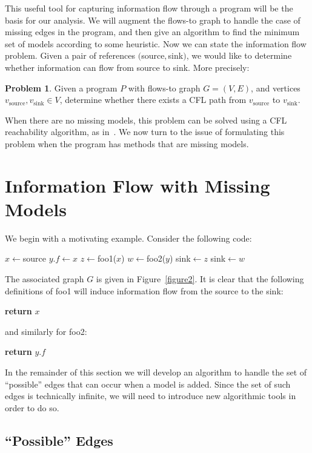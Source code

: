 \documentclass[10pt,twocolumn]{article}
\theoremstyle{definition}
\newtheorem{problem}[theorem]{Problem}
\begin{document}
\noindent This useful tool for capturing information flow through a program will be the basis for our analysis. We will augment the flows-to graph to handle the case of missing edges in the program, and then give an algorithm to find the minimum set of models according to some heuristic. Now we can state the information flow problem. Given a pair of references $($source$,$sink$)$, we would like to determine whether information can flow from source to sink. More precisely:
\begin{problem}
\label{flowproblem}
Given a program $P$ with flows-to graph $G=(V,E)$, and vertices $v_{\text{source}},v_{\text{sink}}\in V$, determine whether there exists a CFL path from $v_{\text{source}}$ to $v_{\text{sink}}$.
\end{problem}
When there are no missing models, this problem can be solved using a CFL reachability algorithm, as in~\cite{reps97}. We now turn to the issue of formulating this problem when the program has methods that are missing models.

\section{Information Flow with Missing Models}

\noindent We begin with a motivating example. Consider the following code:
\begin{algorithmic}
\State $x\gets$source
\State $y.f\gets x$
\State $z\gets$foo1($x$)
\State $w\gets$foo2($y$)
\State sink$\gets z$
\State sink$\gets w$
\end{algorithmic}
\noindent The associated graph $G$ is given in Figure~\ref{figure2}. It is clear that the following definitions of foo1 will induce information flow from the source to the sink:
\begin{algorithmic}
  \State\textbf{return} $x$
\EndProcedure
\end{algorithmic}
and similarly for foo2:
\begin{algorithmic}
	\State\textbf{return} $y.f$
\EndProcedure
\end{algorithmic}
\noindent In the remainder of this section we will develop an algorithm to handle the set of ``possible'' edges that can occur when a model is added. Since the set of such edges is technically infinite, we will need to introduce new algorithmic tools in order to do so.

\subsection{``Possible'' Edges}
\end{document}
